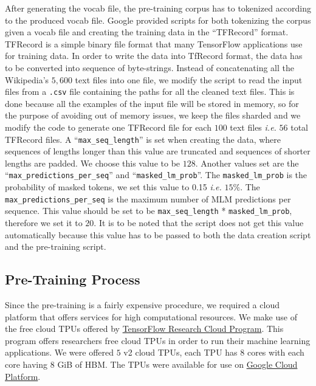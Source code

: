 After generating the vocab file, the pre-training corpus has to tokenized according to the produced vocab file. Google provided scripts for both tokenizing the corpus given a vocab file and creating the training data in the \enquote{TFRecord} format. TFRecord is a simple binary file format that many TensorFlow applications use for training data. In order to write the data into TfRecord format, the data has to be converted into sequence of byte-strings. Instead of concatenating all the Wikipedia's $5,600$ text files into one file, we modify the script to read the input files from a \texttt{.csv} file containing the paths for all the cleaned text files. This is done because all the examples of the input file will be stored in memory, so for the purpose of avoiding out of memory issues, we keep the files sharded and we modify the code to generate one TFRecord file for each $100$ text files \textit{i.e.} $56$ total TFRecord files. 
A \enquote{\texttt{max\_seq\_length}} 
is set when creating the data, where sequences of lengths longer than this value are truncated and sequences of shorter lengths are padded. We choose this value to be $128$. Another values set are the \enquote{\texttt{max\_predictions\_per\_seq}} and \enquote{\texttt{masked\_lm\_prob}}. The \texttt{masked\_lm\_prob} is the probability of masked tokens, we set this value to 0.15 \textit{i.e.} $15\%$. The \texttt{max\_predictions\_per\_seq} is the maximum number of \ac{MLM} predictions per sequence. This value should be set to be \texttt{max\_seq\_length} * \texttt{masked\_lm\_prob}, therefore we set it to $20$. It is to be noted that the script does not get this value automatically because this value has to be passed to both the data creation script and the pre-training script.
 
 
\subsection{Pre-Training Process}
\label{meth:sub3}

Since the pre-training is a fairly expensive procedure, we required a cloud platform that offers services for high computational resources. We make use of the free cloud \ac{TPU}s offered by \href{https://www.tensorflow.org/tfrc}{TensorFlow Research Cloud Program}. This program offers researchers free cloud \ac{TPU}s in order to run their machine learning applications. We were offered $5$ v2 cloud \ac{TPU}s, each \ac{TPU} has $8$ cores with each core having $8$ GiB of \ac{HBM}. The \ac{TPU}s were available for use on \href{https://cloud.google.com/}{Google Cloud Platform}.


